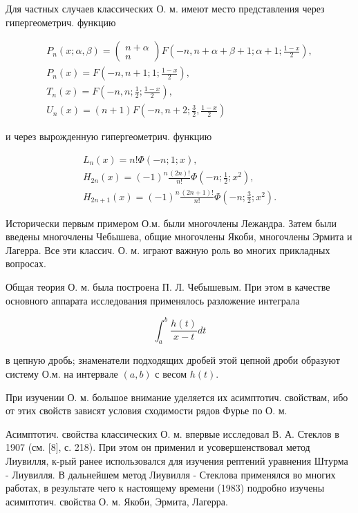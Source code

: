 \documentclass[10pt]{article}
\begin{document}
Для частных случаев классических О. м. имеют место представления через гипергеометрич. функцию

\[
\begin{gathered}
P_{n}(x ; \alpha, \beta)=\left(\begin{array}{c}
n+\alpha \\
n
\end{array}\right) F\left(-n, n+\alpha+\beta+1 ; \alpha+1 ; \frac{1-x}{2}\right), \\
P_{n}(x)=F\left(-n, n+1 ; 1 ; \frac{1-x}{2}\right), \\
T_{n}(x)=F\left(-n, n ; \frac{1}{2} ; \frac{1-x}{2}\right), \\
U_{n}(x)=(n+1) F\left(-n, n+2 ; \frac{3}{2}, \frac{1-x}{2}\right)
\end{gathered}
\]

и через вырожденную гипергеометрич. функцию

\[
\begin{gathered}
L_{n}(x)=n ! \Phi(-n ; 1 ; x), \\
H_{2 n}(x)=(-1)^{n} \frac{(2 n) !}{n !} \Phi\left(-n ; \frac{1}{2} ; x^{2}\right), \\
H_{2 n+1}(x)=(-1)^{n} \frac{(2 n+1) !}{n !} \Phi\left(-n ; \frac{3}{2} ; x^{2}\right) .
\end{gathered}
\]

Исторически первым примером О.м. были многочлены Лежандра. Затем были введены многочлены Чебышева, общие многочлены Якоби, многочлены Эрмита и Лагерра. Все эти классич. О. м. играют важную роль во многих прикладных вопросах.

Общая теория О. м. была построена П. Л. Чебышевым. При этом в качестве основного аппарата исследования применялось разложение интеграла

\[
\int_{a}^{b} \frac{h(t)}{x-t} d t
\]

в цепную дробь; знаменатели подходящих дробей этой цепной дроби образуют систему О.м. на интервале $(a, b)$ с весом $h(t)$.

При изучении О. м. большое внимание уделяется их асимптотич. свойствам, ибо от этих свойств зависят условия сходимости рядов Фурье по О. м.

Асимптотич. свойства классических О. м. впервые исследовал В. А. Стеклов в 1907 (см. [8], с. 218). При этом он применил и усовершенствовал метод Лиувилля, к-рый ранее использовался для изучения рептений уравнения Штурма - Лиувилля. В дальнейшем метод Лиувилля - Стеклова применялся во многих работах, в результате чего к настоящему времени (1983) подробно изучены асимптотич. свойства О. м. Якоби, Эрмита, Лагерра.
\end{document}
